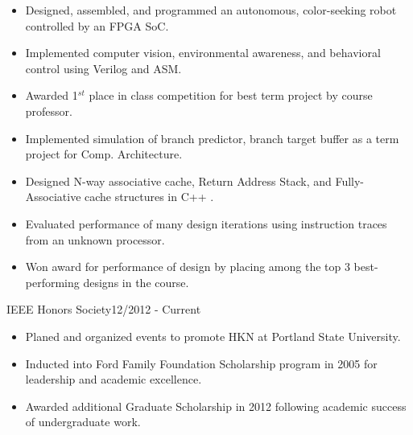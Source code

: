 \documentclass{article}
\begin{document}
	\begin{itemize}\setlength{\itemsep}{-4pt}
		\item Designed, assembled, and programmed an autonomous, color-seeking robot controlled by an FPGA SoC.  
		\item Implemented computer vision, environmental awareness, and behavioral control using Verilog and ASM.
		\item Awarded 1$^{st}$ place in class competition for best term project by course professor.   		
	\end{itemize}
	
	
	
		\begin{itemize} \setlength{\itemsep}{-4pt}
			\item Implemented simulation of branch predictor, branch target buffer as a term project for Comp. Architecture.
			\item Designed N-way associative cache, Return Address Stack, and Fully-Associative cache structures in C++	.
			\item Evaluated performance of many design iterations using instruction traces from an unknown processor.
			\item Won award for performance of design by placing among the top 3 best-performing designs in the course. 
		\end{itemize}
		
\vspace{-10pt}
\vspace{3pt}

 {IEEE Honors Society}{12/2012 - Current}

	\begin{itemize} \setlength{\itemsep}{-4pt}	
		\item Planed and organized events to promote HKN at Portland State University.
	\end{itemize}	\vspace{-2pt}


	\begin{itemize} \setlength{\itemsep}{-4pt}
		\item Inducted into Ford Family Foundation Scholarship program in 2005 for leadership and academic excellence.
		\item Awarded additional Graduate Scholarship in 2012 following academic success of undergraduate work.
	\end{itemize}
\end{document}
